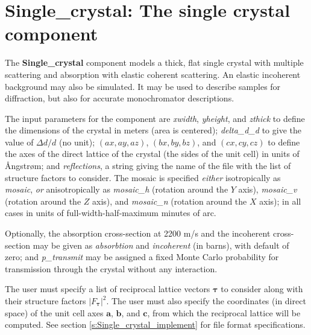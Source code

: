\section{Single\_crystal: The single crystal component}
\label{s:Single_crystal}


The {\bf Single\_crystal} component models a thick, flat single crystal
with multiple scattering and absorption with elastic coherent scattering.
An elastic incoherent background may also be simulated.
It may be used to describe samples for diffraction,
but also for accurate monochromator descriptions.

The input parameters for the component are \textit{xwidth},
\textit{yheight}, and \textit{zthick} to define the dimensions of the
crystal in meters (area is centered); \textit{delta\_d\_d} to give the
value of $\Delta d/d$ (no unit);
$(\textit{ax}, \textit{ay}, \textit{az})$, $(\textit{bx}, \textit{by},
\textit{bz})$, and $(\textit{cx}, \textit{cy}, \textit{cz})$ to define
the axes of the direct lattice of the crystal (the sides of the unit
cell) in units of {\AA}ngstr{\o}m; and \textit{reflections}, a string
giving the name of the file with the list of structure factors to
consider.
The mosaic is specified \emph{either} isotropically as
\textit{mosaic}, \emph{or} anisotropically as \textit{mosaic\_h}
(rotation around the $Y$ axis), \textit{mosaic\_v} (rotation around the
$Z$ axis), and \textit{mosaic\_n} (rotation around the $X$ axis); in all
cases in units of full-width-half-maximum minutes of arc.

Optionally, the absorption cross-section at 2200 m/s and the incoherent
cross-section may be given as \textit{absorbtion} and
\textit{incoherent} (in barns), with default of zero; and
\textit{p\_transmit} may be assigned a fixed Monte Carlo probability for
transmission through the crystal without any interaction.

The user must specify a list of reciprocal lattice vectors
$\boldsymbol{\tau}$ to consider along with their structure factors
$|F_{\boldsymbol{\tau}}|^2$. The user must also specify the coordinates
(in direct space) of the unit cell axes $\boldsymbol{a}$,
$\boldsymbol{b}$, and $\boldsymbol{c}$, from which the reciprocal lattice
will be computed. See section \ref{s:Single_crystal_implement} for file format specifications.

